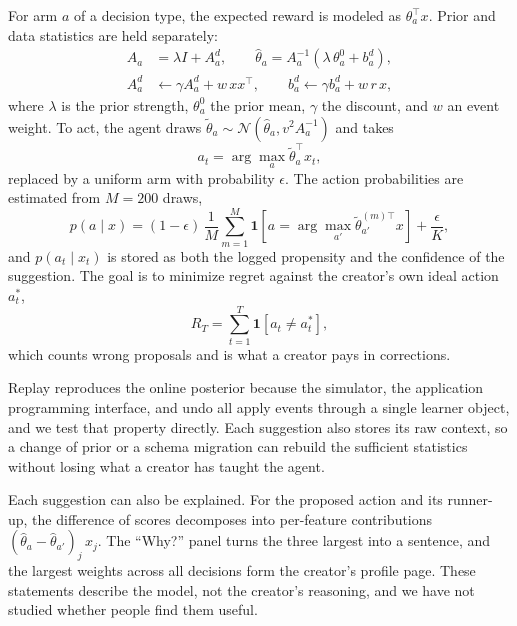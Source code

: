 \documentclass{ieeeaccess}
\begin{document}
For arm $a$ of a decision type, the expected reward is modeled as $\theta_a^{\top} x$. Prior and data statistics are held separately:
\begin{align}
A_a &= \lambda I + A_a^{d}, \qquad \hat\theta_a = A_a^{-1}\left(\lambda\,\theta_a^{0} + b_a^{d}\right), \label{eq:post}\\
A_a^{d} &\leftarrow \gamma A_a^{d} + w\,x x^{\top}, \qquad b_a^{d} \leftarrow \gamma b_a^{d} + w\,r\,x, \label{eq:upd}
\end{align}
where $\lambda$ is the prior strength, $\theta_a^{0}$ the prior mean, $\gamma$ the discount, and $w$ an event weight. To act, the agent draws $\tilde\theta_a \sim \mathcal{N}(\hat\theta_a, v^{2} A_a^{-1})$ and takes
\begin{equation}
a_t = \arg\max_a \tilde\theta_a^{\top} x_t, \label{eq:ts}
\end{equation}
replaced by a uniform arm with probability $\epsilon$. The action probabilities are estimated from $M=200$ draws,
\begin{equation}
p(a \mid x) = (1-\epsilon)\,\frac{1}{M}\sum_{m=1}^{M} \mathbf{1}\left[a = \arg\max_{a'} \tilde\theta_{a'}^{(m)\top} x\right] + \frac{\epsilon}{K}, \label{eq:prop}
\end{equation}
and $p(a_t \mid x_t)$ is stored as both the logged propensity and the confidence of the suggestion. The goal is to minimize regret against the creator's own ideal action $a_t^{*}$,
\begin{equation}
R_T = \sum_{t=1}^{T} \mathbf{1}\left[a_t \neq a_t^{*}\right], \label{eq:regret}
\end{equation}
which counts wrong proposals and is what a creator pays in corrections.

Replay reproduces the online posterior because the simulator, the application programming interface, and undo all apply events through a single learner object, and we test that property directly. Each suggestion also stores its raw context, so a change of prior or a schema migration can rebuild the sufficient statistics without losing what a creator has taught the agent.

Each suggestion can also be explained. For the proposed action and its runner-up, the difference of scores decomposes into per-feature contributions $(\hat\theta_{a}-\hat\theta_{a'})_j\,x_j$. The ``Why?'' panel turns the three largest into a sentence, and the largest weights across all decisions form the creator's profile page. These statements describe the model, not the creator's reasoning, and we have not studied whether people find them useful.
\end{document}
